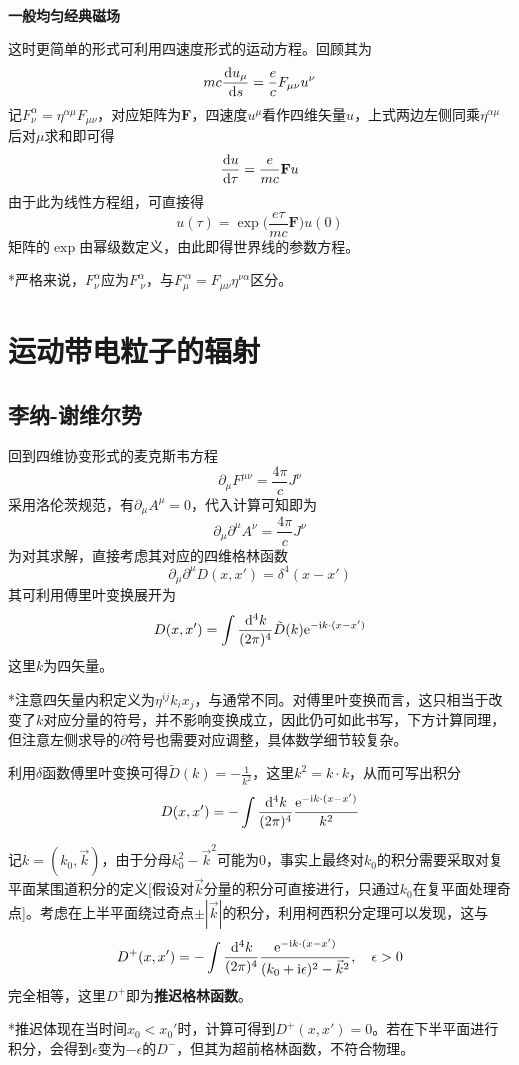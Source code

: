 \documentclass[a4paper,UTF8,fontset=windows]{ctexart}
\newcommand*{\dr}{\hspace{0.07em}\mathrm{d}}
\newcommand*{\er}{\mathrm{e}}
\newcommand*{\ir}{\mathrm{i}}
\newcommand*{\vks}{\vec{k}}
\newcommand*{\dt}[2][t]{\frac{\dr #2}{\dr #1}}
\begin{document}
\

\textbf{一般均匀经典磁场}

这时更简单的形式可利用四速度形式的运动方程。回顾其为
$$mc\dt[s]{u_\mu}=\frac{e}{c}F_{\mu\nu}u^\nu$$
记$F^\alpha_\nu=\eta^{\alpha\mu}F_{\mu\nu}$，对应矩阵为$\mathbf{F}$，四速度$u^\mu$看作四维矢量$u$，上式两边左侧同乘$\eta^{\alpha\mu}$后对$\mu$求和即可得
$$\dt[\tau]u=\frac{e}{mc}\mathbf{F}u$$
由于此为线性方程组，可直接得
$$u(\tau)=\exp\bigg(\frac{e\tau}{mc}\mathbf{F}\bigg)u(0)$$
矩阵的$\exp$由幂级数定义，由此即得世界线的参数方程。

*严格来说，$F^\alpha_\nu$应为$F^\alpha_{\ \nu}$，与$F^{\ \alpha}_\mu=F_{\mu\nu}\eta^{\nu\alpha}$区分。

\section{运动带电粒子的辐射}
\subsection{李纳-谢维尔势}
回到四维协变形式的麦克斯韦方程
$$\partial_\mu F^{\mu\nu}=\frac{4\pi}{c}J^\nu$$
采用洛伦茨规范，有$\partial_\mu A^\mu=0$，代入计算可知即为
$$\partial_\mu\partial^\mu A^\nu=\frac{4\pi}{c}J^\nu$$
为对其求解，直接考虑其对应的四维格林函数
$$\partial_\mu\partial^\mu D(x,x')=\delta^4(x-x')$$
其可利用傅里叶变换展开为
$$D(x,x')=\int\frac{\dr^4k}{(2\pi)^4}\tilde{D}(k)\er^{-\ir k\cdot(x-x')}$$
这里$k$为四矢量。

*注意四矢量内积定义为$\eta^{ij}k_ix_j$，与通常不同。对傅里叶变换而言，这只相当于改变了$k$对应分量的符号，并不影响变换成立，因此仍可如此书写，下方计算同理，但注意左侧求导的$\partial$符号也需要对应调整，具体数学细节较复杂。

利用$\delta$函数傅里叶变换可得$\tilde{D}(k)=-\frac{1}{k^2}$，这里$k^2=k\cdot k$，从而可写出积分
$$D(x,x')=-\int\frac{\dr^4k}{(2\pi)^4}\frac{\er^{-\ir k\cdot(x-x')}}{k^2}$$

记$k=(k_0,\vks)$，由于分母$k_0^2-\vks^2$可能为0，事实上最终对$k_0$的积分需要采取对复平面某围道积分的定义[假设对$\vks$分量的积分可直接进行，只通过$k_0$在复平面处理奇点]。考虑在上半平面绕过奇点$\pm|\vks|$的积分，利用柯西积分定理可以发现，这与
$$D^+(x,x')=-\int\frac{\dr^4k}{(2\pi)^4}\frac{\er^{-\ir k\cdot(x-x')}}{(k_0+\ir\epsilon)^2-\vks^2},\quad\epsilon>0$$
完全相等，这里$D^+$即为\textbf{推迟格林函数}。

*推迟体现在当时间$x_0<x_0'$时，计算可得到$D^+(x,x')=0$。若在下半平面进行积分，会得到$\epsilon$变为$-\epsilon$的$D^-$，但其为超前格林函数，不符合物理。
\end{document}

